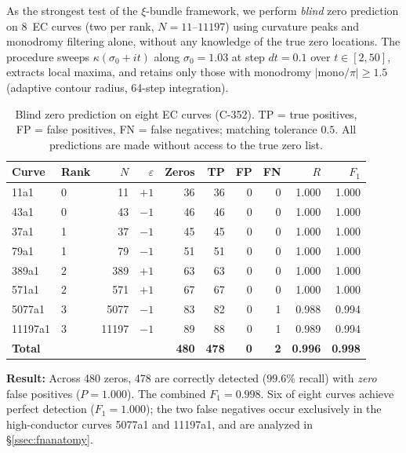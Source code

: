 \documentclass[11pt, a4paper]{article}
\theoremstyle{plain}
\theoremstyle{definition}
\begin{document}
As the strongest test of the $\xi$-bundle framework, we perform
\emph{blind} zero prediction on 8~EC curves (two per rank,
$N=11$--$11197$) using curvature peaks and monodromy filtering alone,
without any knowledge of the true zero locations.  The procedure sweeps
$\kappa(\sigma_{0}+it)$ along $\sigma_{0}=1.03$ at step $dt=0.1$
over $t\in[2,50]$, extracts local maxima, and retains only those with
monodromy $|\mathrm{mono}/\pi| \geq 1.5$ (adaptive contour radius,
64-step integration).

\begin{table}[ht]
\centering
\caption{Blind zero prediction on eight EC curves (C-352).
  TP = true positives, FP = false positives, FN = false negatives;
  matching tolerance $0.5$.  All predictions are made without access
  to the true zero list.}
\label{tab:blind}
\small
\begin{tabular}{llrrrrrrrr}
\toprule
Curve & Rank & $N$ & $\varepsilon$ & Zeros & TP & FP & FN & $R$ & $F_{1}$ \\
\midrule
11a1    & 0 &    11 & $+1$ & 36  & 36 & 0 & 0 & 1.000 & 1.000 \\
43a1    & 0 &    43 & $-1$ & 46  & 46 & 0 & 0 & 1.000 & 1.000 \\
37a1    & 1 &    37 & $-1$ & 45  & 45 & 0 & 0 & 1.000 & 1.000 \\
79a1    & 1 &    79 & $-1$ & 51  & 51 & 0 & 0 & 1.000 & 1.000 \\
389a1   & 2 &   389 & $+1$ & 63  & 63 & 0 & 0 & 1.000 & 1.000 \\
571a1   & 2 &   571 & $+1$ & 67  & 67 & 0 & 0 & 1.000 & 1.000 \\
5077a1  & 3 &  5077 & $-1$ & 83  & 82 & 0 & 1 & 0.988 & 0.994 \\
11197a1 & 3 & 11197 & $-1$ & 89  & 88 & 0 & 1 & 0.989 & 0.994 \\
\midrule
\multicolumn{4}{l}{\textbf{Total}} & \textbf{480} & \textbf{478} &
  \textbf{0} & \textbf{2} & \textbf{0.996} & \textbf{0.998} \\
\bottomrule
\end{tabular}
\end{table}

\textbf{Result:} Across 480 zeros, 478 are correctly detected
($99.6\%$ recall) with \emph{zero} false positives ($P=1.000$).
The combined $F_{1}=0.998$.  Six of eight curves achieve perfect
detection ($F_{1}=1.000$); the two false negatives occur exclusively
in the high-conductor curves 5077a1 and 11197a1, and are analyzed in
\S\ref{ssec:fnanatomy}.
\end{document}
